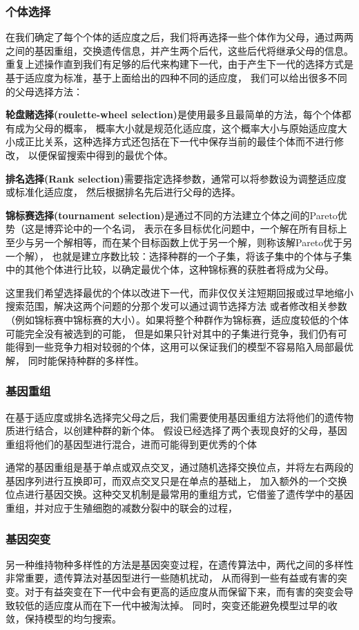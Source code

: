 \documentclass[12pt, a4paper, oneside]{ctexart}
\numberwithin{equation}{section}  %
\begin{document}
\subsubsection{个体选择}
在我们确定了每个个体的适应度之后，我们将再选择一些个体作为父母，通过两两之间的基因重组，交换遗传信息，并产生两个后代，这些后代将继承父母的信息。
重复上述操作直到我们有足够的后代来构建下一代，由于产生下一代的选择方式是基于适应度为标准，基于上面给出的四种不同的适应度，
我们可以给出很多不同的父母选择方法：

\textbf{轮盘赌选择(roulette-wheel selection)}是使用最多且最简单的方法\cite{bib-Mirjalili2019}，每个个体都有成为父母的概率，
概率大小就是规范化适应度，这个概率大小与原始适应度大小成正比关系，这种选择方式还包括在下一代中保存当前的最佳个体而不进行修改\cite{bib-Ahn2003}，
以便保留搜索中得到的最优个体。

\textbf{排名选择(Rank selection)\cite{bib-Razali2011}}需要指定选择参数，通常可以将参数设为调整适应度或标准化适应度，
然后根据排名先后进行父母的选择。

\textbf{锦标赛选择(tournament selection)\cite{bib-Miller1995}}是通过不同的方法建立个体之间的Pareto优势（这是博弈论中的一个名词，
表示在多目标优化问题中，一个解在所有目标上至少与另一个解相等，而在某个目标函数上优于另一个解，则称该解Pareto优于另一个解），
也就是建立序数比较：选择种群的一个子集，将该子集中的个体与子集中的其他个体进行比较，以确定最优个体，这种锦标赛的获胜者将成为父母。

这里我们希望选择最优的个体以改进下一代，而非仅仅关注短期回报或过早地缩小搜索范围，解决这两个问题的分那个发可以通过调节选择方法
或者修改相关参数（例如锦标赛中锦标赛的大小）。如果将整个种群作为锦标赛，适应度较低的个体可能完全没有被选到的可能，
但是如果只针对其中的子集进行竞争，我们仍有可能得到一些竞争力相对较弱的个体，这用可以保证我们的模型不容易陷入局部最优解，
同时能保持种群的多样性。
\subsubsection{基因重组}
在基于适应度或排名选择完父母之后，我们需要使用基因重组方法将他们的遗传物质进行结合，以创建种群的新个体。
假设已经选择了两个表现良好的父母，基因重组将他们的基因型进行混合，进而可能得到更优秀的个体

通常的基因重组是基于单点或双点交叉，通过随机选择交换位点，并将左右两段的基因序列进行互换即可，而双点交叉只是在单点的基础上，
加入额外的一个交换位点进行基因交换。这种交叉机制是最常用的重组方式，它借鉴了遗传学中的基因重组，并对应于生殖细胞的减数分裂中的联会的过程，
\subsubsection{基因突变}
另一种维持物种多样性的方法是基因突变过程，在遗传算法中，两代之间的多样性非常重要\cite{bib-Horn1994}，遗传算法对基因型进行一些随机扰动，
从而得到一些有益或有害的突变。对于有益突变在下一代中会有更高的适应度从而保留下来，而有害的突变会导致较低的适应度从而在下一代中被淘汰掉。
同时，突变还能避免模型过早的收敛，保持模型的均匀搜索\cite{bib-Holland1992}。
\end{document}
